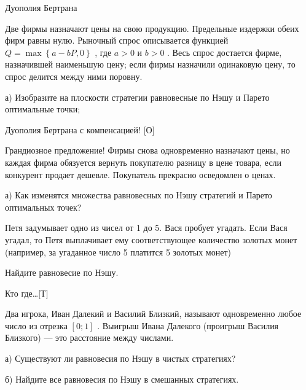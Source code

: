 \begin{problem}
 Дуополия Бертрана\par
Две фирмы назначают цены на свою продукцию. Предельные издержки обеих фирм равны нулю. Рыночный спрос описывается функцией  $Q=\max \left\{a-bP,0\right\}$ , где  $a>0$  и  $b>0$ . Весь спрос достается фирме, назначившей наименьшую цену; если фирмы назначили одинаковую цену, то спрос делится между ними поровну.\par
а)	Изобразите на плоскости стратегии равновесные по Нэшу и Парето оптимальные точки;



\begin{sol}

\end{sol}
\end{problem}



\begin{problem}
 Дуополия Бертрана с компенсацией! $[$О$]$\par
Грандиозное предложение! Фирмы снова одновременно назначают цены, но каждая фирма обязуется вернуть покупателю разницу в цене товара, если конкурент продает дешевле. Покупатель прекрасно осведомлен о ценах.\par
а)	Как изменятся множества равновесных по Нэшу стратегий и Парето оптимальных точек?



\begin{sol}

\end{sol}
\end{problem}



\begin{problem}

Петя задумывает одно из чисел от 1 до 5. Вася пробует угадать. Если Вася угадал, то Петя выплачивает ему соответствующее количество золотых монет (например, за угаданное число 5 платится 5 золотых монет) \par
Найдите равновесие по Нэшу.



\begin{sol}

\end{sol}
\end{problem}



\begin{problem}
 Кто где\ldots $[$Т$]$\par
Два игрока, Иван Далекий и Василий Близкий, называют одновременно любое число из отрезка  $\left[0;1\right]$ . Выигрыш Ивана Далекого (проигрыш Василия Близкого) — это расстояние между числами.\par
а)	Существуют ли равновесия по Нэшу в чистых стратегиях?\par
б)	Найдите все равновесия по Нэшу в смешанных стратегиях.



\begin{sol}

\end{sol}
\end{problem}



